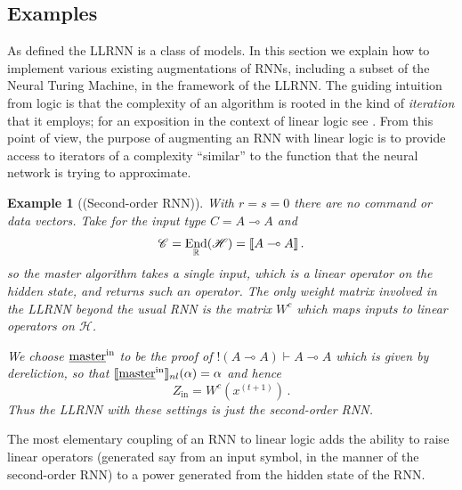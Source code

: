 \documentclass[english,letter paper,12pt,leqno]{article}
\theoremstyle{example}
\newtheorem{example}[theorem]{Example}
\numberwithin{equation}{section}
\def\be{\begin{equation}}
\def\ee{\end{equation}}
\DeclareMathOperator{\End}{End}
\begin{document}
\subsection{Examples}

As defined the LLRNN is a class of models. In this section we explain how to implement various existing augmentations of RNNs, including a subset of the Neural Turing Machine, in the framework of the LLRNN. The guiding intuition from logic is that the complexity of an algorithm is rooted in the kind of \emph{iteration} that it employs; for an exposition in the context of linear logic see \cite[\S 7]{murfet_ll}. From this point of view, the purpose of augmenting an RNN with linear logic is to provide access to iterators of a complexity ``similar'' to the function that the neural network is trying to approximate.

\begin{example}[(Second-order RNN)] With $r = s = 0$ there are no command or data vectors. Take for the input type $C = A \multimap A$ and
\[
\mathscr{C} = \End_{\mathbb{R}}(\mathscr{H}) = \den{A \multimap A}\,.
\]
so the master algorithm takes a single input, which is a linear operator on the hidden state, and returns such an operator. The only weight matrix involved in the LLRNN beyond the usual RNN is the matrix $W^c$ which maps inputs to linear operators on $\mathscr{H}$.

We choose $\underline{\textup{master}}^{\mathrm{in}}$ to be the proof of ${!}(A \multimap A) \vdash A \multimap A$ which is given by dereliction, so that $\llbracket \underline{\textup{master}}^{\mathrm{in}} \rrbracket_{nl}(\alpha) = \alpha$ and hence
\be\label{eq:secondorderRNNinLLRNN}
Z_{\mathrm{in}} = W^c(x^{(t+1)})\,.
\ee
Thus the LLRNN with these settings is just the second-order RNN.
\end{example}

The most elementary coupling of an RNN to linear logic adds the ability to raise linear operators (generated say from an input symbol, in the manner of the second-order RNN) to a power generated from the hidden state of the RNN. 
\end{document}
